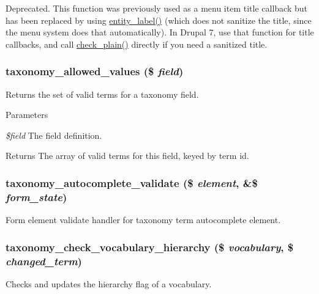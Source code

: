 Deprecated. This function was previously used as a menu item title callback but has been replaced by using \hyperlink{common_8inc_aa9868513964b440f8206571573b833b3}{entity\_\-label()} (which does not sanitize the title, since the menu system does that automatically). In Drupal 7, use that function for title callbacks, and call \hyperlink{group__sanitization_ga76fc67a30fd8d75ddd80565e6e65a13d}{check\_\-plain()} directly if you need a sanitized title. \hypertarget{taxonomy_8module_ae0381bf0e025fac9d606887241c3c8f9}{
\subsubsection[{taxonomy\_\-allowed\_\-values}]{\setlength{\rightskip}{0pt plus 5cm}taxonomy\_\-allowed\_\-values (\$ {\em field})}}
\label{taxonomy_8module_ae0381bf0e025fac9d606887241c3c8f9}
Returns the set of valid terms for a taxonomy field.


\begin{DoxyParams}{Parameters}
\item[{\em \$field}]The field definition. \end{DoxyParams}
\begin{DoxyReturn}{Returns}
The array of valid terms for this field, keyed by term id. 
\end{DoxyReturn}
\hypertarget{taxonomy_8module_a424a1d85875dc55781d8f0e840fae87e}{
\subsubsection[{taxonomy\_\-autocomplete\_\-validate}]{\setlength{\rightskip}{0pt plus 5cm}taxonomy\_\-autocomplete\_\-validate (\$ {\em element}, \/  \&\$ {\em form\_\-state})}}
\label{taxonomy_8module_a424a1d85875dc55781d8f0e840fae87e}
Form element validate handler for taxonomy term autocomplete element. \hypertarget{taxonomy_8module_ab3cdfed98d0af251a848d898f47e7dd5}{
\subsubsection[{taxonomy\_\-check\_\-vocabulary\_\-hierarchy}]{\setlength{\rightskip}{0pt plus 5cm}taxonomy\_\-check\_\-vocabulary\_\-hierarchy (\$ {\em vocabulary}, \/  \$ {\em changed\_\-term})}}
\label{taxonomy_8module_ab3cdfed98d0af251a848d898f47e7dd5}
Checks and updates the hierarchy flag of a vocabulary.

